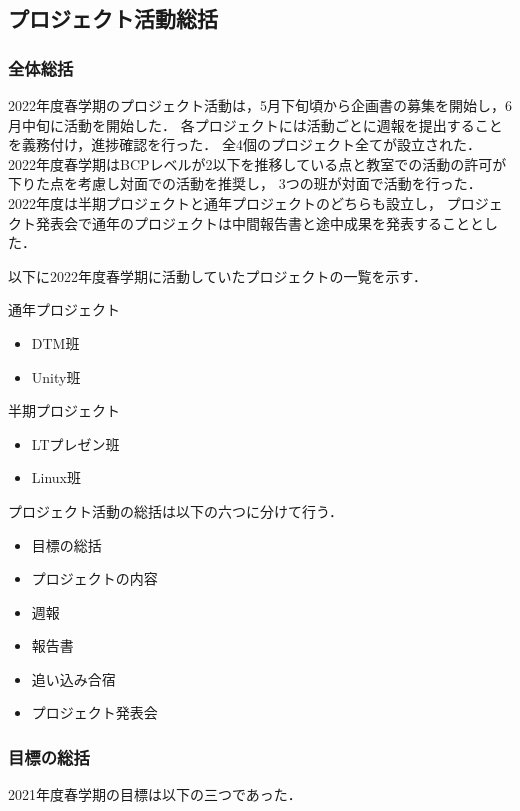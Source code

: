 \subsection*{プロジェクト活動総括}


\subsubsection*{全体総括}
2022年度春学期のプロジェクト活動は，5月下旬頃から企画書の募集を開始し，6月中旬に活動を開始した．
各プロジェクトには活動ごとに週報を提出することを義務付け，進捗確認を行った．
全4個のプロジェクト全てが設立された．
2022年度春学期はBCPレベルが2以下を推移している点と教室での活動の許可が下りた点を考慮し対面での活動を推奨し，
3つの班が対面で活動を行った．
2022年度は半期プロジェクトと通年プロジェクトのどちらも設立し，
プロジェクト発表会で通年のプロジェクトは中間報告書と途中成果を発表することとした．

以下に2022年度春学期に活動していたプロジェクトの一覧を示す．

通年プロジェクト
\begin{itemize}
  \item DTM班
  \item Unity班
\end{itemize}

半期プロジェクト
\begin{itemize}
  \item LTプレゼン班
  \item Linux班
\end{itemize}

プロジェクト活動の総括は以下の六つに分けて行う．

\begin{itemize}
  \item 目標の総括
  \item プロジェクトの内容
  \item 週報
  \item 報告書
  \item 追い込み合宿
  \item プロジェクト発表会
\end{itemize}

\subsubsection*{目標の総括}
2021年度春学期の目標は以下の三つであった．

